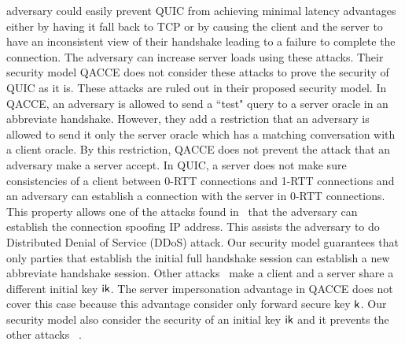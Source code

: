 adversary could easily prevent QUIC from achieving
minimal latency advantages either by having it fall back
to TCP or by causing the client and the server to have an
inconsistent view of their handshake leading to a failure
to complete the connection.
The adversary can increase server loads using
these attacks.
Their security model QACCE does not consider these attacks
to prove the security of QUIC as it is.
These attacks are ruled out in their proposed security model.
In QACCE, an adversary
is allowed to send a ``test" query to a server oracle in an
abbreviate handshake.
However, they add a restriction that an adversary is allowed
to send it only the server oracle which has a matching
conversation with a client oracle.
By this restriction, QACCE does not prevent the attack that
an adversary make a server accept.
In QUIC, a server does not make sure consistencies of a client
between 0-RTT connections and 1-RTT connections and
an adversary can establish a connection with the server in 0-RTT connections.
This property allows one of the attacks found in~\cite{LJBN15:QUIC} that
the adversary can establish the connection spoofing IP address.
This assists the adversary to do Distributed Denial of Service
(DDoS) attack.
Our security model guarantees that only parties
that establish the initial full handshake session can
establish a new abbreviate handshake session.
Other attacks~\cite{LJBN15:QUIC} make a client and a server share
a different initial key $\mathsf{ik}$.
The server impersonation advantage in QACCE does not
cover this case because this advantage consider only forward
secure key $\mathsf{k}$.
Our security model also consider the security of an initial
key $\mathsf{ik}$ and it prevents the other attacks
~\cite{LJBN15:QUIC}.

